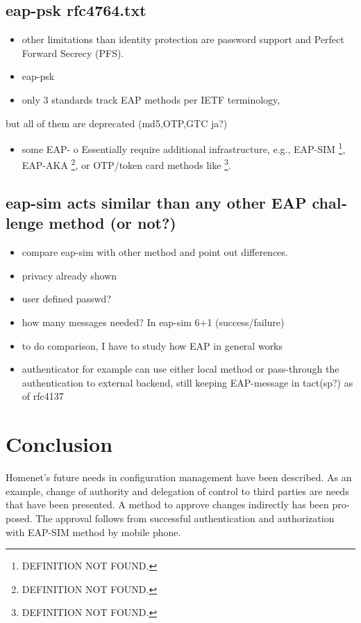 \documentclass[12pt,a4paper,english]{tutthesis}
\begin{document}
\begin{otherlanguage}{english}
\section{eap-psk rfc4764.txt}
\label{sec-7-3}
\begin{itemize}
\item other limitations than identity protection are password support and Perfect Forward Secrecy (PFS).
\item eap-psk
\item only 3 standards track EAP methods per IETF terminology,
\end{itemize}
but all of them are deprecated (md5,OTP,GTC ja?)
\begin{itemize}
\item some EAP- o  Essentially require additional infrastructure, e.g., EAP-SIM \footnote{DEFINITION NOT FOUND.},
EAP-AKA \footnote{DEFINITION NOT FOUND.}, or OTP/token card methods like \footnote{DEFINITION NOT FOUND.}.
\end{itemize}


\section{eap-sim acts similar than any other EAP challenge method (or not?)}
\label{sec-7-4}
\begin{itemize}
\item compare eap-sim with other method and point out differences.
\item privacy already shown
\item user defined passwd?
\item how many messages needed? In eap-sim 6+1 (success/failure)
\item to do comparison, I have to study how EAP in general works
\item authenticator for example can use either local method or
pass-through the authentication to external backend, still keeping
EAP-message in tact(sp?) as of  rfc4137
\end{itemize}


\chapter{Conclusion}
\label{sec-8}




Homenet's future needs in configuration management have been
described. As an example, change of authority and delegation of
control to third parties are needs that have been presented.  A method to approve
changes indirectly has been proposed. The approval follows from
successful authentication and authorization with EAP-SIM method by
mobile phone. 




\end{otherlanguage}
\end{document}
